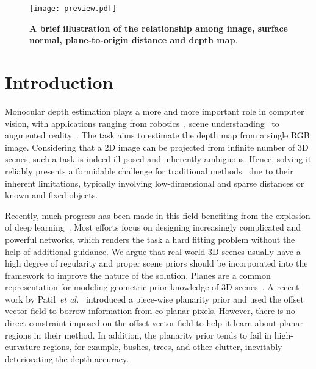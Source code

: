 \documentclass[10pt,twocolumn,letterpaper]{article}
\begin{document}
\normalem
\begin{figure}[!htb]
\centering
	\texttt{[image: preview.pdf]}\caption{\textbf{A brief illustration of the relationship among image, surface normal, plane-to-origin distance and depth map}. }
	\label{Fig1}
\end{figure}
\section{Introduction}
Monocular depth estimation plays a more and more important role in computer vision, with applications ranging from robotics~\cite{tateno2017cnn,jia2022object}, scene understanding~\cite{hazirbas2016fusenet} to augmented reality~\cite{lee2011depth}. The task aims to estimate the depth map from a single RGB image. Considering that a 2D image can be projected from infinite number of 3D scenes, such a task is indeed ill-posed and inherently ambiguous. Hence, solving it reliably presents a formidable challenge for traditional methods~\cite{michels2005high,nagai2002hmm} due to their inherent limitations, typically involving low-dimensional and sparse distances or known and fixed objects. 


Recently, much progress has been made in this field benefiting from the explosion of deep learning~\cite{eigen2014depth,fu2018deep,lee2019big,bhat2021adabins,Yuan_2022_CVPR}. Most efforts focus on designing increasingly complicated and powerful networks, which renders the task a hard fitting problem without the help of additional guidance. We argue that real-world 3D scenes usually have a high degree of regularity and proper scene priors should be incorporated into the framework to improve the nature of the solution. Planes are a common representation for modeling geometric prior knowledge of 3D scenes~\cite{bodis2014fast,chauve2010robust,liu2019planercnn}. A recent work by Patil~\textit{et al.}~\cite{patil2022p3depth} introduced a piece-wise planarity prior and used the offset vector field to borrow information from co-planar pixels. However, there is no direct constraint imposed on the offset vector field to help it learn about planar regions in their method. In addition, the planarity prior tends to fail in high-curvature regions, for example, bushes, trees, and other clutter, inevitably deteriorating the depth accuracy.
\end{document}
